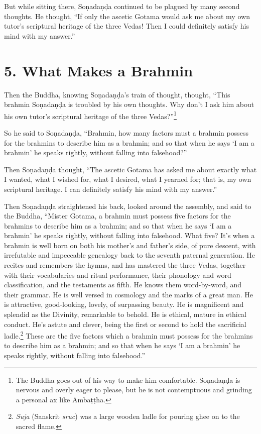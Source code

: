 \documentclass[12pt,openany]{book}%
\begin{document}
But while sitting there, \textsanskrit{Soṇadaṇḍa} continued to be plagued by many second thoughts. He thought, “If only the ascetic Gotama would ask me about my own tutor’s scriptural heritage of the three Vedas! Then I could definitely satisfy his mind with my answer.” 

\section*{5. What Makes a Brahmin }

Then the Buddha, knowing \textsanskrit{Soṇadaṇḍa}’s train of thought, thought, “This brahmin \textsanskrit{Soṇadaṇḍa} is troubled by his own thoughts. Why don’t I ask him about his own tutor’s scriptural heritage of the three Vedas?”\footnote{The Buddha goes out of his way to make him comfortable. \textsanskrit{Soṇadaṇḍa} is nervous and overly eager to please, but he is not contemptuous and grinding a personal ax like \textsanskrit{Ambaṭṭha}. } 

So he said to \textsanskrit{Soṇadaṇḍa}, “Brahmin, how many factors must a brahmin possess for the brahmins to describe him as a brahmin; and so that when he says ‘I am a brahmin’ he speaks rightly, without falling into falsehood?” 

Then \textsanskrit{Soṇadaṇḍa} thought, “The ascetic Gotama has asked me about exactly what I wanted, what I wished for, what I desired, what I yearned for; that is, my own scriptural heritage. I can definitely satisfy his mind with my answer.” 

Then \textsanskrit{Soṇadaṇḍa} straightened his back, looked around the assembly, and said to the Buddha, “Mister Gotama, a brahmin must possess five factors for the brahmins to describe him as a brahmin; and so that when he says ‘I am a brahmin’ he speaks rightly, without falling into falsehood. What five? It’s when a brahmin is well born on both his mother’s and father’s side, of pure descent, with irrefutable and impeccable genealogy back to the seventh paternal generation. He recites and remembers the hymns, and has mastered the three Vedas, together with their vocabularies and ritual performance, their phonology and word classification, and the testaments as fifth. He knows them word-by-word, and their grammar. He is well versed in cosmology and the marks of a great man. He is attractive, good-looking, lovely, of surpassing beauty. He is magnificent and splendid as the Divinity, remarkable to behold. He is ethical, mature in ethical conduct. He’s astute and clever, being the first or second to hold the sacrificial ladle.\footnote{\textit{Suja} (Sanskrit \textit{sruc}) was a large wooden ladle for pouring ghee on to the sacred flame. } These are the five factors which a brahmin must possess for the brahmins to describe him as a brahmin; and so that when he says ‘I am a brahmin’ he speaks rightly, without falling into falsehood.” 
\end{document}
